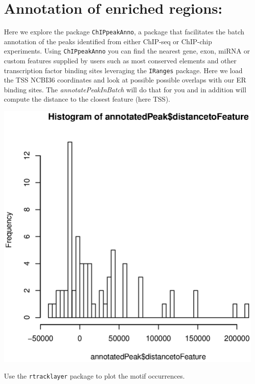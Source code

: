 \documentclass[12pt]{article}
\newcommand{\Rfunction}[1]{{\textit{#1}}}
\newcommand{\Rpackage}[1]{\texttt{#1}}
\begin{document}
\section{Annotation of enriched regions:}
Here we explore the package \Rpackage{ChIPpeakAnno}\cite{Zhu:2010fk}, a package that facilitates the batch annotation of the peaks identified from either ChIP-seq or ChIP-chip experiments. Using \Rpackage{ChIPpeakAnno} you can find the nearest gene, exon, miRNA or custom features supplied by users such as most conserved elements and other transcription factor binding sites leveraging the \Rpackage{IRanges} package. 
Here we load the TSS NCBI36 coordinates and look at possible possible overlaps with our ER binding sites. The \Rfunction{annotatePeakInBatch} will do that for you and in addition will compute the distance to the closest feature (here TSS).
\begin{Schunk}
\end{Schunk}
\includegraphics{chipData_AD-ChIPpeakAnno}


\begin{Exercise}
Use the \Rpackage{rtracklayer} package to plot the motif occurrences.
\end{Exercise}
\end{document}

